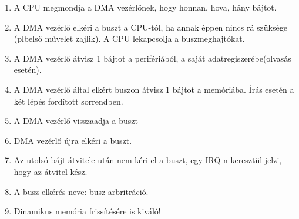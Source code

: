 \documentclass[11pt,a4paper]{article}
\begin{document}
\begin{tcolorbox}[colback=blue!5!white,colframe=blue!50!black,title= 14. Ismertesse a periféria csatolási módszereket{,} módszerenként kitérve az adott módszer előnyére{,} és hátrányára! Part 2.]
\begin{itemize}
\begin{enumerate}
                        \item A CPU megmondja a DMA vezérlőnek, hogy honnan, hova, hány bájtot.
                        \item A DMA vezérlő elkéri a buszt a CPU-tól, ha annak éppen nincs rá szüksége (plbelső művelet zajlik). A CPU lekapcsolja a buszmeghajtókat.
                        \item A DMA vezérlő átvisz 1 bájtot a perifériából, a saját adatregiszerébe(olvasás esetén).
                        \item A DMA vezérlő által elkért buszon átvisz 1 bájtot a memóriába. Írás esetén a két lépés fordított sorrendben.
                        \item A DMA vezérlő visszaadja a buszt
                        \item DMA vezérlő újra elkéri a buszt.
                        \item Az utolsó bájt átvitele után nem kéri el a buszt, egy IRQ-n keresztül jelzi, hogy az átvitel kész.
                        \item A busz elkérés neve: busz arbritráció.
                        \item Dinamikus memória frissítésére is kiváló!
                    \end{enumerate}
                \end{itemize}
                \begin{center}
                \end{center}
            \end{tcolorbox}
            
\end{document}

